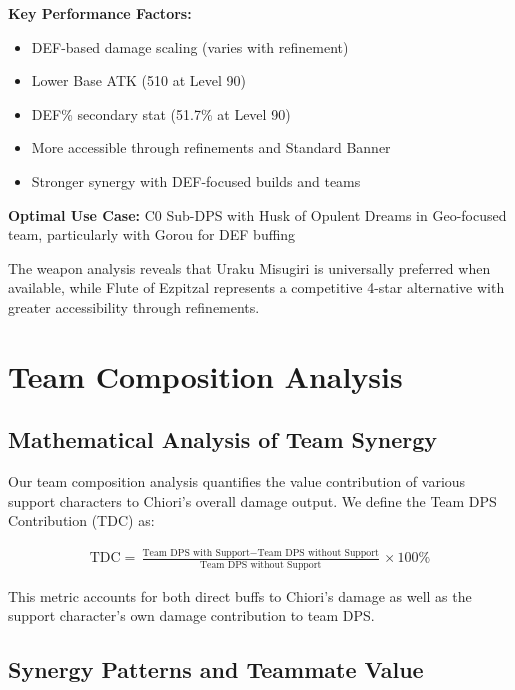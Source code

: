 \documentclass[12pt,a4paper]{article}
\begin{document}
\begin{tcolorbox}[colback=geoyellow!5, colframe=geoyellow, title=Flute of Ezpitzal (R5)]
\textbf{Key Performance Factors:}
\begin{itemize}
    \item DEF-based damage scaling (varies with refinement)
    \item Lower Base ATK (510 at Level 90)
    \item DEF\% secondary stat (51.7\% at Level 90)
    \item More accessible through refinements and Standard Banner
    \item Stronger synergy with DEF-focused builds and teams
\end{itemize}

\textbf{Optimal Use Case:} C0 Sub-DPS with Husk of Opulent Dreams in Geo-focused team, particularly with Gorou for DEF buffing
\end{tcolorbox}

The weapon analysis reveals that Uraku Misugiri is universally preferred when available, while Flute of Ezpitzal represents a competitive 4-star alternative with greater accessibility through refinements.

\section{Team Composition Analysis}

\subsection{Mathematical Analysis of Team Synergy}

Our team composition analysis quantifies the value contribution of various support characters to Chiori's overall damage output. We define the Team DPS Contribution (TDC) as:

\begin{align}
\text{TDC} = \frac{\text{Team DPS with Support} - \text{Team DPS without Support}}{\text{Team DPS without Support}} \times 100\%
\end{align}

This metric accounts for both direct buffs to Chiori's damage as well as the support character's own damage contribution to team DPS.

\subsection{Synergy Patterns and Teammate Value}
\end{document}
